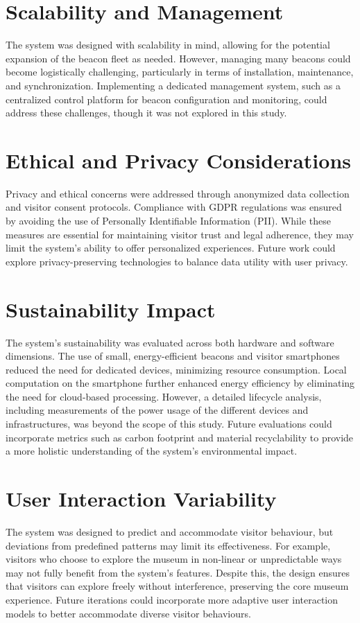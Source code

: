 \section{Scalability and Management}
The system was designed with scalability in mind, allowing for the potential expansion of the beacon fleet as needed. However, managing many beacons could become logistically challenging, particularly in terms of installation, maintenance, and synchronization. Implementing a dedicated management system, such as a centralized control platform for beacon configuration and monitoring, could address these challenges, though it was not explored in this study.

\section{Ethical and Privacy Considerations}
Privacy and ethical concerns were addressed through anonymized data collection and visitor consent protocols. Compliance with GDPR regulations was ensured by avoiding the use of Personally Identifiable Information (PII). While these measures are essential for maintaining visitor trust and legal adherence, they may limit the system’s ability to offer personalized experiences. Future work could explore privacy-preserving technologies to balance data utility with user privacy.

\section{Sustainability Impact}
The system’s sustainability was evaluated across both hardware and software dimensions. The use of small, energy-efficient beacons and visitor smartphones reduced the need for dedicated devices, minimizing resource consumption. Local computation on the smartphone further enhanced energy efficiency by eliminating the need for cloud-based processing. However, a detailed lifecycle analysis, including measurements of the power usage of the different devices and infrastructures, was beyond the scope of this study. Future evaluations could incorporate metrics such as carbon footprint and material recyclability to provide a more holistic understanding of the system’s environmental impact.

\section{User Interaction Variability}
The system was designed to predict and accommodate visitor behaviour, but deviations from predefined patterns may limit its effectiveness. For example, visitors who choose to explore the museum in non-linear or unpredictable ways may not fully benefit from the system’s features. Despite this, the design ensures that visitors can explore freely without interference, preserving the core museum experience. Future iterations could incorporate more adaptive user interaction models to better accommodate diverse visitor behaviours. 

